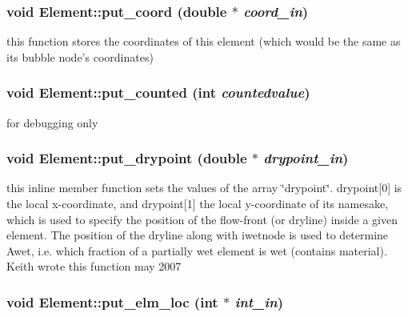 \hypertarget{classElement_a104}{
\subsubsection[put\_\-coord]{\setlength{\rightskip}{0pt plus 5cm}void Element::put\_\-coord (double $\ast$ {\em coord\_\-in})}}
\label{classElement_a104}


this function stores the coordinates of this element (which would be the same as its bubble node's coordinates) 

\hypertarget{classElement_a116}{
\subsubsection[put\_\-counted]{\setlength{\rightskip}{0pt plus 5cm}void Element::put\_\-counted (int {\em countedvalue})}}
\label{classElement_a116}


for debugging only 

\hypertarget{classElement_a128}{
\subsubsection[put\_\-drypoint]{\setlength{\rightskip}{0pt plus 5cm}void Element::put\_\-drypoint (double $\ast$ {\em drypoint\_\-in})}}
\label{classElement_a128}


this inline member function sets the values of the array \char`\"{}drypoint\char`\"{}. drypoint\mbox{[}0\mbox{]} is the local x-coordinate, and drypoint\mbox{[}1\mbox{]} the local y-coordinate of its namesake, which is used to specify the position of the flow-front (or dryline) inside a given element. The position of the dryline along with iwetnode is used to determine Awet, i.e. which fraction of a partially wet element is wet (contains material). Keith wrote this function may 2007 

\hypertarget{classElement_a102}{
\subsubsection[put\_\-elm\_\-loc]{\setlength{\rightskip}{0pt plus 5cm}void Element::put\_\-elm\_\-loc (int $\ast$ {\em int\_\-in})}}
\label{classElement_a102}


